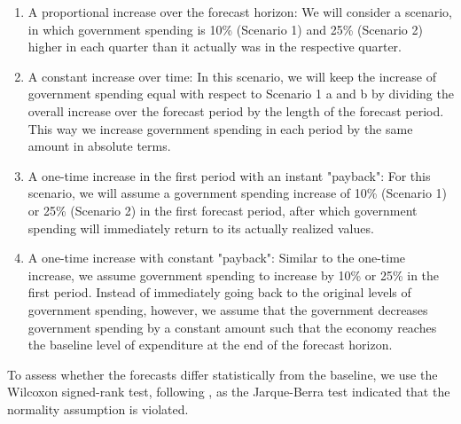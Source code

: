 \begin{enumerate}
	\item	A proportional increase over the forecast horizon: We will consider a scenario, in which government spending is 10\% (Scenario 1) and 25\% (Scenario 2) higher in each quarter than it actually was in the respective quarter.
	\item	A constant increase over time: In this scenario, we will keep the increase of government spending equal with respect to Scenario 1 a and b by dividing the overall increase over the forecast period by the length of the forecast period. This way we increase government spending in each period by the same amount in absolute terms.
	\item	A one-time increase in the first period with an instant "payback": For this scenario, we will assume a government spending increase of 10\% (Scenario 1) or 25\% (Scenario 2) in the first forecast period, after which government spending will immediately return to its actually realized values.
	\item	A one-time increase with constant "payback": Similar to the one-time increase, we assume government spending to increase by 10\% or 25\% in the first period. Instead of immediately going back to the original levels of government spending, however, we assume that the government decreases government spending by a constant amount such that the economy reaches the baseline level of expenditure at the end of the forecast horizon.
\end{enumerate}

To assess whether the forecasts differ statistically from the baseline, we use the Wilcoxon signed-rank test, following \citet{franses1991}, as the Jarque-Berra test indicated that the normality assumption is violated. 





%

